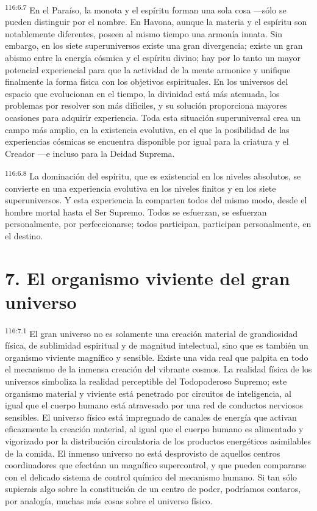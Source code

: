 \documentclass[twoside, 11pt]{book}
\begin{document}
\par
\textsuperscript{116:6.7} En el Paraíso, la monota y el espíritu forman una sola cosa ---sólo se pueden distinguir por el nombre. En Havona, aunque la materia y el espíritu son notablemente diferentes, poseen al mismo tiempo una armonía innata. Sin embargo, en los siete superuniversos existe una gran divergencia; existe un gran abismo entre la energía cósmica y el espíritu divino; hay por lo tanto un mayor potencial experiencial para que la actividad de la mente armonice y unifique finalmente la forma física con los objetivos espirituales. En los universos del espacio que evolucionan en el tiempo, la divinidad está más atenuada, los problemas por resolver son más difíciles, y su solución proporciona mayores ocasiones para adquirir experiencia. Toda esta situación superuniversal crea un campo más amplio, en la existencia evolutiva, en el que la posibilidad de las experiencias cósmicas se encuentra disponible por igual para la criatura y el Creador ---e incluso para la Deidad Suprema.

\par
\textsuperscript{116:6.8} La dominación del espíritu, que es existencial en los niveles absolutos, se convierte en una experiencia evolutiva en los niveles finitos y en los siete superuniversos. Y esta experiencia la comparten todos del mismo modo, desde el hombre mortal hasta el Ser Supremo. Todos se esfuerzan, se esfuerzan personalmente, por perfeccionarse; todos participan, participan personalmente, en el destino.

\section*{7. El organismo viviente del gran universo}
\par
\textsuperscript{116:7.1} El gran universo no es solamente una creación material de grandiosidad física, de sublimidad espiritual y de magnitud intelectual, sino que es también un organismo viviente magnífico y sensible. Existe una vida real que palpita en todo el mecanismo de la inmensa creación del vibrante cosmos. La realidad física de los universos simboliza la realidad perceptible del Todopoderoso Supremo; este organismo material y viviente está penetrado por circuitos de inteligencia, al igual que el cuerpo humano está atravesado por una red de conductos nerviosos sensibles. El universo físico está impregnado de canales de energía que activan eficazmente la creación material, al igual que el cuerpo humano es alimentado y vigorizado por la distribución circulatoria de los productos energéticos asimilables de la comida. El inmenso universo no está desprovisto de aquellos centros coordinadores que efectúan un magnífico supercontrol, y que pueden compararse con el delicado sistema de control químico del mecanismo humano. Si tan sólo supierais algo sobre la constitución de un centro de poder, podríamos contaros, por analogía, muchas más cosas sobre el universo físico.
\end{document}
